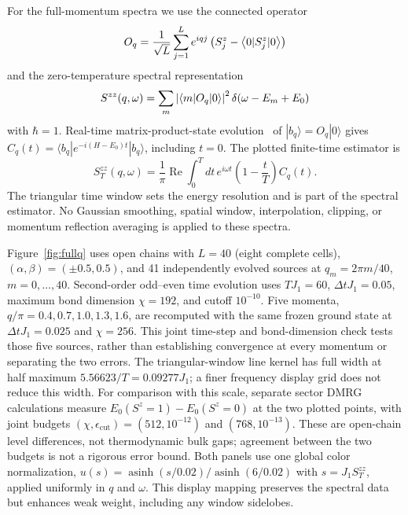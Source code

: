 For the full-momentum spectra we use the connected operator
\begin{equation}
O_q=\frac{1}{\sqrt{L}}\sum_{j=1}^{L}e^{iqj}
\left(S_j^z-\left\langle 0|S_j^z|0\right\rangle\right)
\label{eq:momentum-source}
\end{equation}
and the zero-temperature spectral representation
\begin{equation}
S^{zz}(q,\omega)=\sum_{m}\left|\left\langle m|O_q|0\right\rangle\right|^2
\delta\!\left(\omega-E_m+E_0\right)
\label{eq:dsf}
\end{equation}
with $\hbar=1$.
Real-time matrix-product-state evolution~\cite{vidal2004,paeckel2019} of
$|b_q\rangle=O_q|0\rangle$ gives
$C_q(t)=\langle b_q|e^{-i(H-E_0)t}|b_q\rangle$, including $t=0$.
The plotted finite-time estimator is
\begin{equation}
S_T^{zz}(q,\omega)=\frac{1}{\pi}\operatorname{Re}
\int_0^T dt\,e^{i\omega t}\left(1-\frac{t}{T}\right)C_q(t).
\label{eq:finite-time-dsf}
\end{equation}
The triangular time window sets the energy resolution and is part of the
spectral estimator.
No Gaussian smoothing, spatial window, interpolation, clipping, or momentum
reflection averaging is applied to these spectra.

Figure~\ref{fig:fullq} uses open chains with $L=40$ (eight complete cells),
$(\alpha,\beta)=(\pm0.5,0.5)$, and 41 independently evolved sources at
$q_m=2\pi m/40$, $m=0,\ldots,40$.
Second-order odd--even time evolution uses $TJ_1=60$, $\Delta tJ_1=0.05$,
maximum bond dimension $\chi=192$, and cutoff $10^{-10}$.
Five momenta, $q/\pi=0.4,0.7,1.0,1.3,1.6$, are recomputed with the same frozen
ground state at $\Delta tJ_1=0.025$ and $\chi=256$.
This joint time-step and bond-dimension check tests those five sources, rather
than establishing convergence at every momentum or separating the two errors.
The triangular-window line kernel has full width at half maximum
$5.56623/T=0.09277J_1$; a finer frequency display grid does not reduce this width.
For comparison with this scale, separate sector DMRG calculations measure
$E_0(S^z=1)-E_0(S^z=0)$ at the two plotted points, with joint budgets
$(\chi,\epsilon_{\mathrm{cut}})=(512,10^{-12})$ and $(768,10^{-13})$.
These are open-chain level differences, not thermodynamic bulk gaps; agreement
between the two budgets is not a rigorous error bound.
Both panels use one global color normalization,
$u(s)=\operatorname{asinh}(s/0.02)/\operatorname{asinh}(6/0.02)$ with
$s=J_1S_T^{zz}$, applied uniformly in $q$ and $\omega$.
This display mapping preserves the spectral data but enhances weak weight,
including any window sidelobes.

